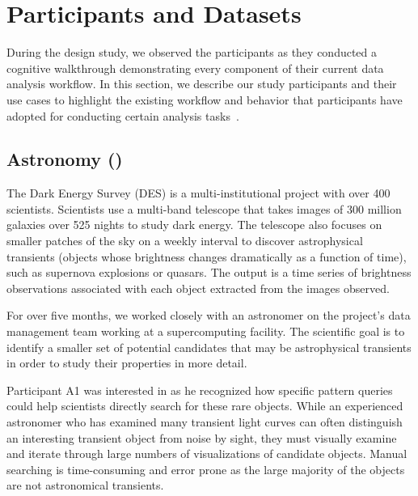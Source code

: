 \section{Participants and Datasets}
During the design study, we observed the participants as they conducted a cognitive walkthrough demonstrating every component of their current data analysis workflow. In this section, we describe our study participants and their use cases to highlight the existing workflow and behavior that participants have adopted for conducting certain analysis tasks~\cite{Nielsen1994}.
\subsection{Astronomy (\astro)} 
\par The Dark Energy Survey (DES) is a multi-institutional project with over 400 scientists. Scientists use a multi-band telescope that takes images of 300 million galaxies over 525 nights to study dark energy\cite{Drlica-Wagner2017}. The telescope also focuses on smaller patches of the sky on a weekly interval to discover astrophysical transients (objects whose brightness changes dramatically as a function of time), such as supernova explosions or quasars. The output is a time series of brightness observations associated with each object extracted from the images observed.
\par For over five months, we worked closely with an astronomer on the project's data management team working at a supercomputing facility. The scientific goal is to identify a smaller set of potential candidates that may be astrophysical transients in order to study their properties in more detail. 
\par Participant A1 was interested in \zv as he recognized how specific pattern queries could help scientists directly search for these rare objects. While an experienced astronomer who has examined many transient light curves can often distinguish an interesting transient object from noise by sight, they must visually examine and iterate through large numbers of visualizations of candidate objects. Manual searching is time-consuming and error prone as the large majority of the objects are not astronomical transients. 

